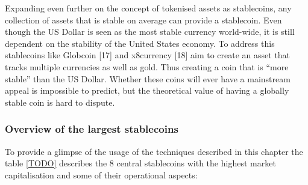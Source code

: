 \documentclass[english,]{IEEEtran}
\begin{document}
Expanding even further on the concept of tokenised assets as
stablecoins, any collection of assets that is stable on average can
provide a stablecoin. Even though the US Dollar is seen as the most
stable currency world-wide, it is still dependent on the stability of
the United States economy. To address this stablecoins like Globcoin
{[}17{]} and x8currency {[}18{]} aim to create an asset that tracks
multiple currencies as well as gold. Thus creating a coin that is ``more
stable'' than the US Dollar. Whether these coins will ever have a
mainstream appeal is impossible to predict, but the theoretical value of
having a globally stable coin is hard to dispute.

\subsubsection{Overview of the largest
stablecoins}\label{overview-of-the-largest-stablecoins}

To provide a glimpse of the usage of the techniques described in this
chapter the table \ref{TODO} describes the 8 central stablecoins with
the highest market capitalisation and some of their operational aspects:
\end{document}
